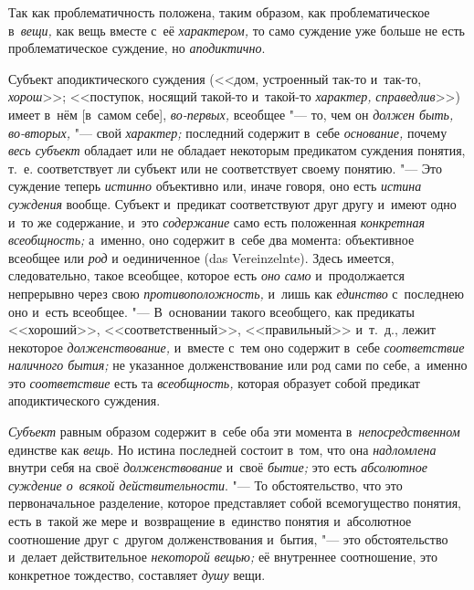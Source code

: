 \label{bkm:bm66b}Так как проблематичность положена, таким образом, как
проблематическое в~{\em вещи,} как вещь вместе с~её {\em характером,} то само
суждение уже больше не есть проблематическое суждение, но {\em аподиктично}.


Субъект аподиктического суждения (<<дом, устроенный так-то и~так-то,
{\em хорош}>>; <<поступок, носящий такой-то и~такой-то {\em характер,}
{\em справедлив}>>) имеет в~нём [в~самом себе], {\em во-первых,}
всеобщее "--- то, чем он {\em должен быть, во-вторых,} "--- свой
{\em характер;} последний содержит в~себе {\em основание,} почему
{\em весь субъект} обладает или не обладает некоторым предикатом суждения
понятия, т.~е. соответствует ли субъект или не соответствует своему
понятию. "--- Это суждение теперь {\em истинно} объективно или, иначе говоря,
оно есть {\em истина суждения} вообще. Субъект и~предикат соответствуют друг
другу и~имеют одно и~то же содержание, и~это {\em содержание} само есть
положенная {\em конкретная всеобщность;} а~именно, оно содержит в~себе два
момента: объективное всеобщее или {\em род} и
оединиченное (das Verein\-zelnte). Здесь имеется, следовательно, такое
всеобщее, которое есть {\em оно само} и~продолжается непрерывно через свою
{\em противоположность,} и~лишь как {\em единство} с~последнею оно и~есть
всеобщее. "--- В~основании такого всеобщего, как предикаты <<хороший>>,
<<соответственный>>, <<правильный>> и~т.~д., лежит некоторое
{\em долженствование,} и~вместе с~тем оно содержит в~себе {\em соответствие
наличного бытия;} не указанное долженствование или род сами по себе, а~именно
это {\em соответствие} есть та {\em всеобщность,} которая образует собой
предикат аподиктического суждения.

{\em Субъект} равным образом содержит в~себе оба эти момента
в~{\em непосредственном} единстве как {\em вещь}. Но истина последней состоит
в~том, что она {\em надломлена} внутри себя на своё {\em долженствование}
и~своё {\em бытие;} это есть {\em абсолютное суждение о~всякой
действительности}. "--- То обстоятельство,
что это первоначальное разделение, которое представляет собой всемогущество
понятия, есть в~такой же мере и~возвращение в~единство понятия и~абсолютное
соотношение друг с~другом долженствования и~бытия, "--- это обстоятельство
и~делает действительное {\em некоторой вещью;} её внутреннее соотношение,
это конкретное тождество, составляет {\em душу} вещи.

